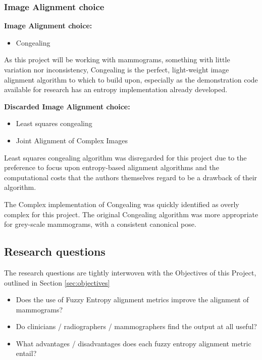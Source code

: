 \subsubsection{Image Alignment choice}

\textbf{Image Alignment choice:}
\begin{itemize}
    \item Congealing
\end{itemize}

As this project will be working with mammograms, something with little variation nor inconsistency, Congealing is the perfect, light-weight image alignment algorithm to which to build upon, especially as the demonstration code available for research has an entropy implementation already developed.

\textbf{Discarded Image Alignment choice:}
\begin{itemize}
    \item Least squares congealing
    \item Joint Alignment of Complex Images
\end{itemize}

Least squares congealing algorithm was disregarded for this project due to the preference to focus upon entropy-based alignment algorithms and the computational costs that the authors themselves regard to be a drawback of their algorithm.

The Complex implementation of Congealing was quickly identified as overly complex for this project. The original Congealing algorithm was more appropriate for grey-scale mammograms, with a consistent canonical pose.

\subsection{Research questions}

The research questions are tightly interwoven with the Objectives of this Project, outlined in Section \ref{sec:objectives}

\begin{itemize}
  \item Does the use of Fuzzy Entropy alignment metrics improve the alignment of mammograms?
  \item Do clinicians / radiographers / mammographers find the output at all useful?
  \item What advantages / disadvantages does each fuzzy entropy alignment metric entail?
\end{itemize}
